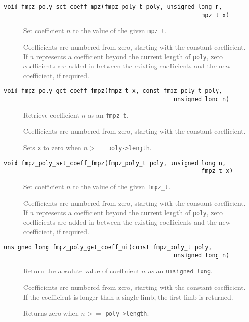 \documentclass[a4paper,10pt]{article}
\newcommand{\code}{\lstinline}
\begin{document}
\begin{lstlisting}
void fmpz_poly_set_coeff_mpz(fmpz_poly_t poly, unsigned long n, 
                                                         mpz_t x) 
\end{lstlisting}
\begin{quote}
Set coefficient $n$ to the value of the given \code{mpz_t}. 

Coefficients are numbered from zero, starting with the constant coefficient. If $n$ represents a coefficient beyond the current length of \code{poly}, zero coefficients are added in between the existing coefficients and the new coefficient, if required.
\end{quote}

\begin{lstlisting}
void fmpz_poly_get_coeff_fmpz(fmpz_t x, const fmpz_poly_t poly, 
                                                 unsigned long n)
\end{lstlisting}
\begin{quote}
Retrieve coefficient $n$ as an \code{fmpz_t}. 

Coefficients are numbered from zero, starting with the constant coefficient.

Sets \code{x} to zero when $n >= $ \code{poly->length}. 
\end{quote}

\begin{lstlisting}
void fmpz_poly_set_coeff_fmpz(fmpz_poly_t poly, unsigned long n, 
                                                         fmpz_t x) 
\end{lstlisting}
\begin{quote}
Set coefficient $n$ to the value of the given \code{fmpz_t}. 

Coefficients are numbered from zero, starting with the constant coefficient. If $n$ represents a coefficient beyond the current length of \code{poly}, zero coefficients are added in between the existing coefficients and the new coefficient, if required.
\end{quote}

\begin{lstlisting}
unsigned long fmpz_poly_get_coeff_ui(const fmpz_poly_t poly, 
                                                 unsigned long n)
\end{lstlisting}
\begin{quote}
Return the absolute value of coefficient $n$ as an \code{unsigned long}.

Coefficients are numbered from zero, starting with the constant coefficient. If the coefficient is longer than a single limb, the first limb is returned.

Returns zero when $n >= $ \code{poly->length}. 
\end{quote}
\end{document}
